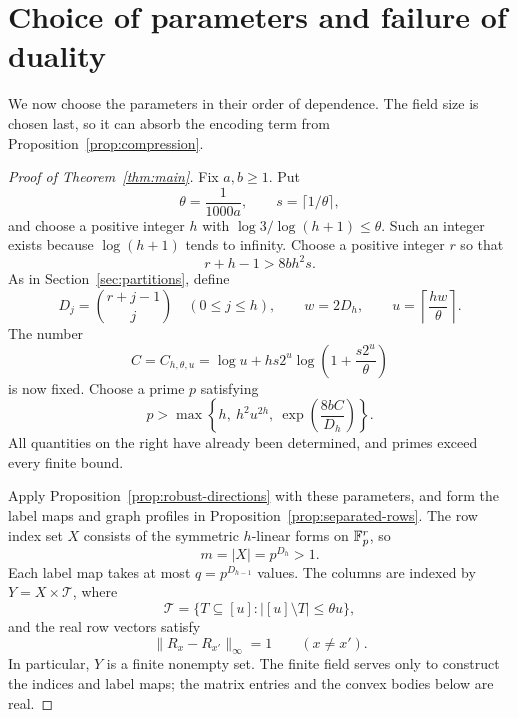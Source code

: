 \section{Choice of parameters and failure of duality}
\label{sec:parameters}

We now choose the parameters in their order of dependence.  The field
size is chosen last, so it can absorb the encoding term from
Proposition~\ref{prop:compression}.

\begin{proof}[Proof of Theorem~\ref{thm:main}]
Fix $a,b\ge1$.  Put
\[
 \theta=\frac1{1000a},
 \qquad s=\lceil1/\theta\rceil,
\]
and choose a positive integer $h$ with
$\log3/\log(h+1)\le\theta$.  Such an integer exists because
$\log(h+1)$ tends to infinity.  Choose a positive integer $r$ so that
\begin{equation}
\label{eq:rank-choice}
 r+h-1>8bh^2s.
\end{equation}
As in Section~\ref{sec:partitions}, define
\[
 D_j=\binom{r+j-1}{j}\quad(0\le j\le h),
 \qquad w=2D_h,
 \qquad u=\left\lceil\frac{hw}{\theta}\right\rceil.
\]
The number
\begin{equation}
\label{eq:fixed-encoding-term}
 C=C_{h,\theta,u}
   =\log u+hs2^u\log\left(1+\frac{s2^u}{\theta}\right)
\end{equation}
is now fixed.  Choose a prime $p$ satisfying
\begin{equation}
\label{eq:prime-choice}
 p>\max\left\{
       h,\ h^2u^{2h},\ \exp\left(\frac{8bC}{D_h}\right)
      \right\}.
\end{equation}
All quantities on the right have already been determined, and primes
exceed every finite bound.

Apply Proposition~\ref{prop:robust-directions} with these parameters,
and form the label maps and graph profiles in
Proposition~\ref{prop:separated-rows}.  The row index set $X$ consists
of the symmetric $h$-linear forms on $\mathbb F_p^r$, so
\[
 m=|X|=p^{D_h}>1.
\]
Each label map takes at most $q=p^{D_{h-1}}$ values.  The columns are
indexed by $Y=X\times\mathcal T$, where
\[
 \mathcal T=\{T\subseteq[u]:|[u]\setminus T|\le\theta u\},
\]
and the real row vectors satisfy
\begin{equation}
\label{eq:final-row-separation}
 \|R_x-R_{x'}\|_\infty=1\qquad(x\ne x').
\end{equation}
In particular, $Y$ is a finite nonempty set.  The finite field serves
only to construct the indices and label maps; the matrix entries and
the convex bodies below are real.


\end{proof}
